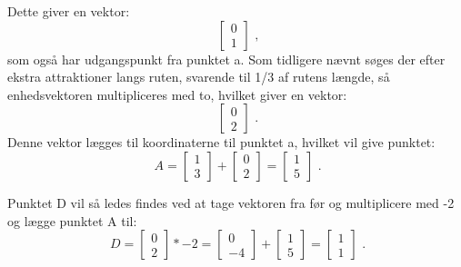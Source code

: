 Dette giver en vektor: 
\[\ \begin{bmatrix} 0 \\ 1 \end{bmatrix} \text{ ,} \]
som også har udgangspunkt fra punktet a. Som tidligere nævnt søges der efter ekstra attraktioner langs ruten, svarende til 1/3 af rutens længde, så enhedsvektoren multipliceres med to, hvilket giver en vektor: 
\[\ \begin{bmatrix} 0 \\ 2 \end{bmatrix} \textbf{ .} \]
Denne vektor lægges til koordinaterne til punktet a, hvilket vil give punktet:
\[\ A = \begin{bmatrix} 1 \\ 3 \end{bmatrix} + \begin{bmatrix} 0 \\ 2 \end{bmatrix} = \begin{bmatrix} 1 \\ 5 \end{bmatrix} \text{ .} \]

Punktet D vil så ledes findes  ved at tage vektoren fra før og multiplicere med -2 og lægge punktet A til:
\[\ D = \begin{bmatrix} 0 \\ 2 \end{bmatrix} * -2 = \begin{bmatrix} 0 \\ -4 \end{bmatrix} + \begin{bmatrix} 1 \\ 5 \end{bmatrix} = \begin{bmatrix} 1 \\ 1 \end{bmatrix} \text{ .} \]


